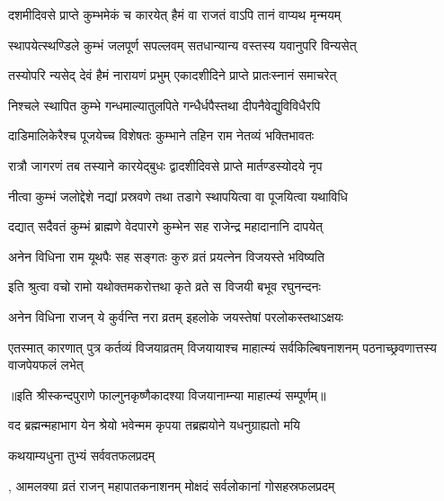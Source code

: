 \twolineshloka
{दशमीदिवसे प्राप्ते कुम्भमेकं च कारयेत्}
{हैमं वा राजतं वाऽपि तानं वाप्यथ मृन्मयम्} %

\twolineshloka
{स्थापयेत्स्थण्डिले कुम्भं जलपूर्ण सपल्लवम्}
{सतधान्यान्य वस्तस्य यवानुपरि विन्यसेत्} %

\twolineshloka
{तस्योपरि न्यसेद् देवं हैमं नारायणं प्रभुम्}
{एकादशीदिने प्राप्ते प्रातःस्नानं समाचरेत्} %

\twolineshloka
{निश्चले स्थापित कुम्भे गन्धमाल्यातुलपिते}
{गन्धैर्धपैस्तथा दीपनैवेद्युविविधैरपि} %

\twolineshloka
{दाडिमालिकेरैश्च पूजयेच्च विशेषतः}
{कुम्भाने तहिन राम नेतव्यं भक्तिभावतः} %

\twolineshloka
{रात्रौ जागरणं तब तस्याने कारयेद्बुधः}
{द्वादशीदिवसे प्राप्ते मार्तण्डस्योदये नृप} %

\twolineshloka
{नीत्वा कुम्भं जलोद्देशे नद्यां प्रस्रवणे तथा}
{तडागे स्थापयित्वा वा पूजयित्वा यथाविधि} %

\twolineshloka
{दद्यात् सदैवतं कुम्भं ब्राह्मणे वेदपारगे}
{कुम्भेन सह राजेन्द्र महादानानि दापयेत्} %

\twolineshloka
{अनेन विधिना राम यूथपैः सह सङ्गतः}
{कुरु व्रतं प्रयत्नेन विजयस्ते भविष्यति} %

\twolineshloka
{इति श्रुत्वा वचो रामो यथोक्तमकरोत्तथा}
{कृते व्रते स विजयी बभूव रघुनन्दनः} %

\twolineshloka
{अनेन विधिना राजन् ये कुर्वन्ति नरा व्रतम्}
{इहलोके जयस्तेषां परलोकस्तथाऽक्षयः} %


\threelineshloka
{एतस्मात् कारणात् पुत्र कर्तव्यं विजयाव्रतम्}
{विजयायाश्च माहात्म्यं सर्वकिल्बिषनाशनम्}
{पठनाच्छ्रवणात्तस्य वाजपेयफलं लभेत्} %

॥इति श्रीस्कन्दपुराणे फाल्गुनकृष्णैकादश्या विजयानाम्न्या माहात्म्यं सम्पूर्णम्॥


\hyperref[sec:ekadashi_mahatmyam_vrata_raja]{\closesub}
\clearpage

\label{sec:vrata-raja-phalguna-shuklamalaki}


\twolineshloka
{वद ब्रह्मन्महाभाग येन श्रेयो भवेन्मम}
{कृपया तब्रह्मयोने यधनुग्राह्यतो मयि} %



\onelineshloka
{कथयाम्यधुना तुभ्यं सर्ववतफलप्रदम्} %

\twolineshloka
{, आमलक्या व्रतं राजन् महापातकनाशनम्}
{मोक्षदं सर्वलोकानां गोसहस्रफलप्रदम्} %

